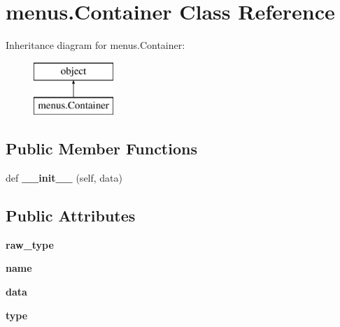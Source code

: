 \hypertarget{classmenus_1_1_container}{}\section{menus.\+Container Class Reference}
\label{classmenus_1_1_container}
Inheritance diagram for menus.\+Container\+:\begin{figure}[H]
\begin{center}
\leavevmode
\includegraphics[height=2.000000cm]{classmenus_1_1_container}
\end{center}
\end{figure}
\subsection*{Public Member Functions}
\begin{DoxyCompactItemize}
\item 
\mbox{\label{classmenus_1_1_container_ace093b51d065a19a56b39467aa1cfe66}} 
def {\bfseries \+\_\+\+\_\+init\+\_\+\+\_\+} (self, data)
\end{DoxyCompactItemize}
\subsection*{Public Attributes}
\begin{DoxyCompactItemize}
\item 
\mbox{\label{classmenus_1_1_container_ac6d2c5aabad726f4fe51f22f96c3f12e}} 
{\bfseries raw\+\_\+type}
\item 
\mbox{\label{classmenus_1_1_container_a926a48b4cde967e8ca8c394abc09e690}} 
{\bfseries name}
\item 
\mbox{\label{classmenus_1_1_container_ace4ff1a1c445f0bba0026fbc3df35f63}} 
{\bfseries data}
\item 
\mbox{\label{classmenus_1_1_container_a96af1c60b4ea020510e940361a0008c9}} 
{\bfseries type}
\end{DoxyCompactItemize}


